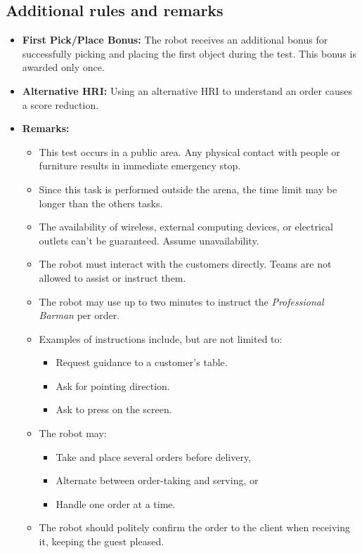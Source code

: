\subsection*{Additional rules and remarks}
\begin{itemize}
	\item \textbf{First Pick/Place Bonus:} The robot receives an additional bonus for successfully picking and placing the first object during the test. This bonus is awarded only once.
	\item \textbf{Alternative HRI:} Using an alternative HRI to understand an order causes a score reduction.
	\item \textbf{Remarks:}
	\begin{itemize}
		\item This test occurs in a public area. Any physical contact with people or furniture results in immediate emergency stop.
		\item Since this task is performed outside the arena, the time limit may be longer than the others tasks.
		\item The availability of wireless, external computing devices, or electrical outlets can't be guaranteed. Assume unavailability.
		\item The robot must interact with the customers directly. Teams are not allowed to assist or instruct them.
		\item The robot may use up to two minutes to instruct the \textit{Professional Barman} per order.
		\item Examples of instructions include, but are not limited to:
        \begin{itemize}[nosep]
            \item Request guidance to a customer’s table.
            \item Ask for pointing direction.
            \item Ask to press on the screen.
        \end{itemize}
		\item The robot may:
        \begin{itemize}[nosep]
            \item Take and place several orders before delivery,
            \item Alternate between order-taking and serving, or
            \item Handle one order at a time.
        \end{itemize}
		\item The robot should politely confirm the order to the client when receiving it, keeping the guest pleased.

\end{itemize}
\end{itemize}
